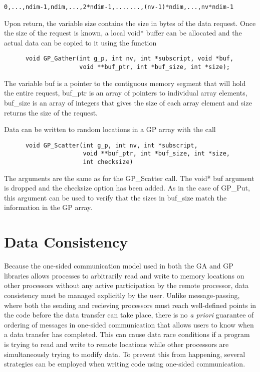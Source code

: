 \begin{verbatim}
0,...,ndim-1,ndim,...,2*ndim-1,.......,(nv-1)*ndim,...,nv*ndim-1
\end{verbatim}

\noindent
Upon return, the variable size contains the size in bytes of the data request.
Once the size of the request is known, a local void* buffer can be allocated and
the actual data can be copied to it using the function

\begin{verbatim}
      void GP_Gather(int g_p, int nv, int *subscript, void *buf,
                     void **buf_ptr, int *buf_size, int *size);
\end{verbatim}

\noindent
The variable buf is a pointer to the contiguous memory segment that will hold
the entire request, buf\_ptr is an array of pointers to individual array
elements, buf\_size is an array of integers that gives the size of each array
element and size returns the size of the request.

Data can be written to random locations in a GP array with the call

\begin{verbatim}
      void GP_Scatter(int g_p, int nv, int *subscript,
                      void **buf_ptr, int *buf_size, int *size,
                      int checksize)
\end{verbatim}

\noindent
The arguments are the same as for the GP\_Scatter call. The void* buf argument
is dropped and the checksize option has been added. As in the case of GP\_Put,
this argument can be used to verify that the sizes in buf\_size match the
information in the GP array.

\section{Data Consistency}

Because the one-sided communication model used in both the GA and GP libraries
allows processes to arbitrarily read and write to memory locations on other
processors without any active participation by the remote processor, data
consistency must be managed explicitly by the user. Unlike message-passing,
where both the sending and recieving processors must reach well-defined points
in the code before the data transfer can take place, there is no \emph{a priori}
guarantee of ordering of messages in one-sided communication that allows users
to know when a data transfer has completed. This can cause data race conditions
if a program is trying to read and write to remote locations while other
processors are simultaneously trying to modify data. To prevent this from
happening, several strategies can be employed when writing code using one-sided
communication.

